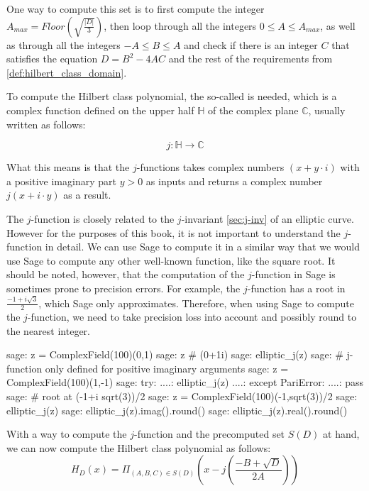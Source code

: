 One way to compute this set is to first compute the integer $A_{max}= Floor(\sqrt{\frac{|D|}{3}})$, then loop through all the integers $0\leq A\leq A_{max}$, as well as through all the integers $-A\leq B \leq A$ and check if there is an integer $C$ that satisfies the equation $D = B^2-4AC$ and the rest of the requirements from \ref{def:hilbert_class_domain}.

To compute the Hilbert class polynomial, the so-called  is needed, which is a complex function defined on the upper half $\mathbb{H}$ of the complex plane $\mathbb{C}$, usually written as follows:

\begin{equation}\label{eq:j-invariant2}
j: \mathbb{H} \to \mathbb{C}
\end{equation}

What this means is that the $j$-functions takes complex numbers $(x +y\cdot i)$ with a positive imaginary part $y>0$ as inputs and returns a complex number $j(x+i\cdot y)$ as a result.

The $j$-function is closely related to the $j$-invariant \ref{sec:j-inv} of an elliptic curve. However for the purposes of this book, it is not important to understand the $j$-function in detail. We can use Sage to compute it in a similar way that we would use Sage to compute any other well-known function, like the square root. It should be noted, however, that the computation of the $j$-function in Sage is sometimes prone to precision errors. For example, the $j$-function has a root in $\frac{-1+i\sqrt{3}}{2}$, which Sage only approximates. Therefore, when using Sage to compute the $j$-function, we need to take precision loss into account and possibly round to the nearest integer.

\begin{sagecommandline}
sage: z = ComplexField(100)(0,1)
sage: z # (0+1i)
sage: elliptic_j(z)
sage: # j-function only defined for positive imaginary arguments
sage: z = ComplexField(100)(1,-1)
sage: try:
....:     elliptic_j(z)
....: except PariError:
....:     pass
sage: # root at (-1+i sqrt(3))/2
sage: z = ComplexField(100)(-1,sqrt(3))/2
sage: elliptic_j(z)
sage: elliptic_j(z).imag().round()
sage: elliptic_j(z).real().round()
\end{sagecommandline}

With a way to compute the $j$-function and the precomputed set $S(D)$ at hand, we can now compute the Hilbert class polynomial as follows:
\begin{equation}
H_D(x) = \Pi_{(A,B,C)\in S(D)} \left(x - j\left(\frac{-B + \sqrt{D}}{2A}\right)\right)
\end{equation}

